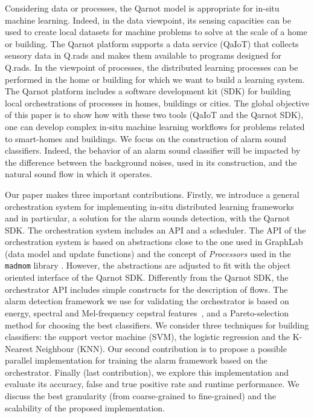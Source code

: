 \documentclass[10pt, conference, compsocconf]{IEEEtran}
\begin{document}
Considering data or processes, the Qarnot model is appropriate for in-situ machine learning. Indeed, in the data viewpoint, 
its sensing capacities can be used to create local datasets for machine problems to solve at the scale of a home or building. 
The Qarnot platform supports a data service (QaIoT) that collects sensory data in Q.rads 
and makes them available to programs designed for Q.rads. 
In the viewpoint of processes, the distributed learning processes can be performed in the home or building for which we want to 
build a learning system. The Qarnot platform includes a software development kit (SDK) for building local orchestrations 
of processes in homes, buildings or cities.
The global objective of this paper is to show how with these two tools (QaIoT and the Qarnot SDK), 
one can develop complex in-situ machine learning workflows for problems related to smart-homes and buildings. 
We focus on the construction of alarm sound classifiers.  Indeed, the behavior of an alarm sound classifier will be impacted by the 
difference between the background noises, used in its construction, and the natural sound flow in which it operates. 

Our paper makes three important contributions. Firstly, we introduce a general orchestration system for implementing in-situ 
distributed learning frameworks and in particular, a solution for the alarm sounds detection, with the Qarnot SDK. 
The orchestration system includes an API and a scheduler. 
The API of the orchestration system is based on abstractions close to the one used in 
GraphLab~\cite{Low:2012:DGF:2212351.2212354} (data model and update functions) and the concept of {\it Processors} used 
in the \texttt{madmom} library \cite{DBLP:journals/corr/BockKSKW16}. However, the abstractions are adjusted to fit with the 
object oriented interface of the Qarnot SDK. Differently from the Qarnot SDK, the orchestrator API includes simple 
constructs for the description of flows. 
The alarm detection framework we use for validating the orchestrator is based on energy, spectral and Mel-frequency cepstral features~\cite{ganchev2005comparative}, \cite{pyAudioAnalysis}
and a Pareto-selection method for choosing the best classifiers. We consider three techniques for building classifiers: the support vector machine (SVM), the logistic regression and the K-Nearest Neighbour (KNN). 
Our second contribution is to propose a possible parallel 
implementation for training the alarm framework based on the orchestrator. Finally (last contribution), 
we explore this implementation and evaluate its accuracy, 
false and true positive rate and runtime performance. We discuss the best granularity (from coarse-grained to fine-grained) and the scalability of the proposed implementation.
\end{document}
